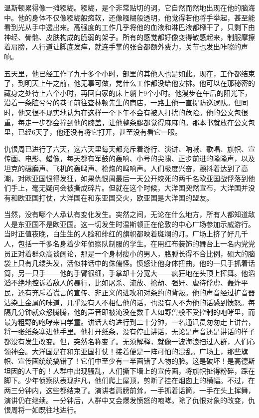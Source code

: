 温斯顿累得像一摊糨糊。糨糊，是个非常贴切的词，它自然而然地出现在他的脑海中。他的身体不仅像糨糊般瘫软，还像糨糊般透明，他觉得若他将手举起，甚至能看到光从手中透出来。高强度的工作几乎将他的血液和淋巴液都榨干了，只剩下由神经、骨骼、皮肤构成的脆弱的架子。所有的感觉都好像变得敏感起来，制服摩擦着肩膀，人行道让脚底发痒，就连手掌的张合都额外费力，关节也发出咔嚓的声响。

五天里，他已经工作了九十多个小时，部里的其他人也是如此。现在，工作都结束了，到明天上午之前，他无事可做，党什么工作都没给他安排。他可以在那秘密的藏身之处待上六个小时，再回自家的床上躺上9个小时。他漫步在午后的阳光下，沿着一条脏兮兮的巷子前往查林顿先生的商店，一路上他一直提防巡逻队。但同时，他又很不现实地认为在这样一个下午不会有被人打扰的危险。他的公文包很重，每走一步都会撞到他的膝盖，让他整条腿都觉得麻麻的。那本书就放在公文包里，已经6天了，他还没有将它打开，甚至没有看它一眼。

仇恨周已进行了六天，这六天里每天都充斥着游行、演讲、呐喊、歌唱、旗帜、宣传画、电影、蜡像，每天都有军鼓的轰响、小号的尖啸、正步前进的隆隆声，以及坦克的碾磨声、飞机的轰鸣声、枪炮的鸣响声。人们极度兴奋，颤抖着达到了高潮，对欧亚国恨得发狂，如果仇恨周最后一天公开绞死的两千名欧亚国战俘落到他们手上，毫无疑问会被撕成碎片。但就在这个时候，大洋国突然宣布，大洋国并没有和欧亚国打仗，大洋国在和东亚国交火，欧亚国是大洋国的盟友。

当然，没有哪个人承认有变化发生。突然之间，无论在什么地方，所有人都知道敌人是东亚国不是欧亚国。这一切发生时温斯顿正在伦敦的中心广场参加示威游行。当时正值夜晚，白生生的人脸和绯红的旗帜都映着斑斓的灯。广场上挤了好几千人，包括一千多名身着少年侦察队制服的学生。在用红布装饰的舞台上一名内党党员正对着群众高谈阔论，那是一个身材瘦小的男人，胳膊长得不合比例，硕大的脑袋上只有几缕头发，活似神话中的侏儒怪。愤怒让他身体扭曲，他的一只手抓着话筒，另一只手——他的手臂很细，手掌却十分宽大——疯狂地在头顶上挥舞。他滔滔不绝地控诉着敌人的暴行，比如屠杀、流放、抢劫、强奸、虐待俘虏、轰炸平民，还有充斥着谎言的宣传、非正义的进攻和对条约的背叛。他的声音经过扩音器沾染上金属的味道，几乎没有人不相信他的话，也没有人不为他的话感到愤怒。每隔几分钟就众怒腾腾，他的声音即被淹没在数千人如野兽般不受控制的咆哮里，而最为粗野的咆哮来自学童。讲话大约进行到二十分钟，一名通讯员匆匆走上讲台，将一张纸条塞进他手里。他打开纸条，没有停止讲话，无论是声音还是讲话的样子都没有发生改变。但，突然名称变了。无须解释，就像一波海浪扫过人群，人们心领神会。大洋国是在和东亚国打仗！接着便是一阵可怕的混乱。广场上，那些旗帜、宣传画统统搞错了！它们中至少有一半画错了人物的脸。这是破坏！是高德斯坦因的人干的！人群中出现骚乱，人们撕下墙上的宣传画，将旗帜扯得粉碎，踩在脚下。少年侦察队表现非凡，他们爬上屋顶，剪断了挂在烟囱上的横幅。不过，在两三分钟内，这些都结束了。演讲者肩膀前耸，一手抓着话筒，一手在头上挥舞，演讲仍在继续。一分钟后，人群中又会爆发愤怒的咆哮。除了仇恨对象的改变，仇恨周将一如既往地进行。

